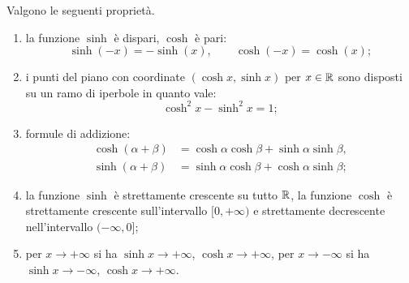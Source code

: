 \begin{theorem}
Valgono le seguenti proprietà.
\begin{enumerate}
\item
la funzione $\sinh$ è dispari, $\cosh$ è pari:
\[
\sinh(-x) = -\sinh(x),
\qquad
\cosh(-x) = \cosh(x);
\]

\item
i punti del piano con coordinate $(\cosh x, \sinh x)$
per $x\in {\mathbb R}$
sono disposti su un ramo di iperbole in quanto vale:
\[
  \cosh^2 x - \sinh^2 x = 1;
\]

\item formule di addizione:
\begin{align*}
  \cosh(\alpha+\beta) &= \cosh \alpha \cosh \beta + \sinh \alpha \sinh \beta,\\
  \sinh(\alpha+\beta) &= \sinh \alpha \cosh \beta + \cosh \alpha \sinh \beta;
\end{align*}


\item
la funzione $\sinh$ è strettamente crescente su tutto ${\mathbb R}$,
la funzione $\cosh$
è strettamente crescente sull'intervallo
$[0,+\infty)$ e strettamente decrescente
nell'intervallo $(-\infty,0]$;

\item per $x\to +\infty$ si ha $\sinh x \to +\infty$, $\cosh x \to +\infty$, 
per $x\to -\infty$ si ha $\sinh x \to -\infty$, $\cosh x \to +\infty$.

\end{enumerate}
\end{theorem}

